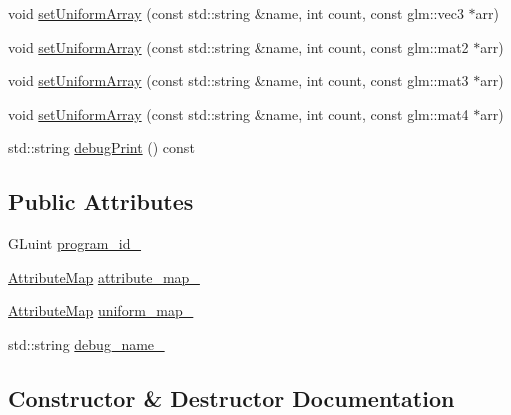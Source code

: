 \begin{DoxyCompactItemize}
\item 
void \hyperlink{classpixel_1_1graphics_1_1_shader_ac8eed10293e5763e17e846a6399a73d7}{set\+Uniform\+Array} (const std\+::string \&name, int count, const glm\+::vec3 $\ast$arr)
\item 
void \hyperlink{classpixel_1_1graphics_1_1_shader_ab66ec7a2709728f850cbf58c95ede200}{set\+Uniform\+Array} (const std\+::string \&name, int count, const glm\+::mat2 $\ast$arr)
\item 
void \hyperlink{classpixel_1_1graphics_1_1_shader_af460da719bfe1b445aa26a6130af2c03}{set\+Uniform\+Array} (const std\+::string \&name, int count, const glm\+::mat3 $\ast$arr)
\item 
void \hyperlink{classpixel_1_1graphics_1_1_shader_a9a28abce164bd88cb90949cd633262ad}{set\+Uniform\+Array} (const std\+::string \&name, int count, const glm\+::mat4 $\ast$arr)
\item 
std\+::string \hyperlink{classpixel_1_1graphics_1_1_shader_a9af96d40a1d237e707737f6206ac5149}{debug\+Print} () const
\end{DoxyCompactItemize}
\subsection*{Public Attributes}
\begin{DoxyCompactItemize}
\item 
G\+Luint \hyperlink{classpixel_1_1graphics_1_1_shader_a3e57a65dcaa2a8438f15741b8e500ab6}{program\+\_\+id\+\_\+}
\item 
\hyperlink{namespacepixel_1_1graphics_ab235534714f227408c552e912c5985de}{Attribute\+Map} \hyperlink{classpixel_1_1graphics_1_1_shader_a023eb7fc4561433cb76584b2059639c5}{attribute\+\_\+map\+\_\+}
\item 
\hyperlink{namespacepixel_1_1graphics_ab235534714f227408c552e912c5985de}{Attribute\+Map} \hyperlink{classpixel_1_1graphics_1_1_shader_aa4146f49500b0010264b791caf576d41}{uniform\+\_\+map\+\_\+}
\item 
std\+::string \hyperlink{classpixel_1_1graphics_1_1_shader_a8b05b646d9f6daa0483587f3f884b5ee}{debug\+\_\+name\+\_\+}
\end{DoxyCompactItemize}


\subsection{Constructor \& Destructor Documentation}
\mbox{\label{classpixel_1_1graphics_1_1_shader_ae278868b21e8a3c4a790501bbb3ea247}} 

